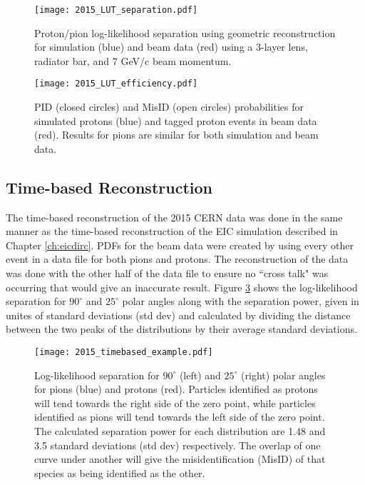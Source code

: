 \begin{figure}[!htb]
	\centering
	\texttt{[image: 2015\_LUT\_separation.pdf]}
	\caption{Proton/pion log-likelihood separation using geometric reconstruction for simulation (blue) and beam data (red) using a 3-layer lens, radiator bar, and 7 GeV/c beam momentum.}
	\label{fig:2015_LUT_separation}
\end{figure}

\begin{figure}[!htb]
	\centering
	\texttt{[image: 2015\_LUT\_efficiency.pdf]}
	\caption{PID (closed circles) and MisID (open circles) probabilities for simulated protons (blue) and tagged proton events in beam data (red). Results for pions are similar for both simulation and beam data.}
	\label{fig:2015_LUT_efficiency}
\end{figure}

\clearpage
\subsection{Time-based Reconstruction}
The time-based reconstruction of the 2015 CERN data was done in the same manner as the time-based reconstruction of the EIC simulation described in Chapter \ref{ch:eicdirc}. PDFs for the beam data were created by using every other event in a data file for both pions and protons. The reconstruction of the data was done with the other half of the data file to ensure no ``cross talk" was occurring that would give an inaccurate result. Figure \ref{fig:2015_timebased_example} shows the log-likelihood separation for $90^\circ$ and $25^\circ$ polar angles along with the separation power, given in unites of standard deviations (std dev) and calculated by dividing the distance between the two peaks of the distributions by their average standard deviations.

\begin{figure}[!htb]
	\centering
	\texttt{[image: 2015\_timebased\_example.pdf]}
	\caption{Log-likelihood separation for $90^\circ$ (left) and $25^\circ$ (right) polar angles for pions (blue) and protons (red). Particles identified as protons will tend towards the right side of the zero point, while particles identified as pions will tend towards the left side of the zero point. The calculated separation power for each distribution are 1.48 and 3.5 standard deviations (std dev) respectively.  The overlap of one curve under another will give the misidentification (MisID) of that species as being identified as the other.}
	\label{fig:2015_timebased_example}
\end{figure}

